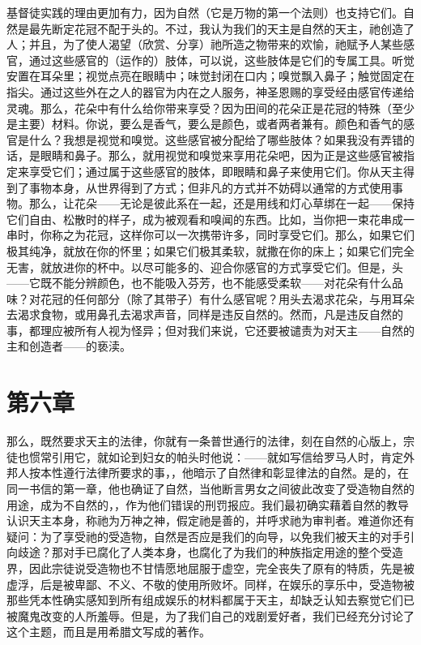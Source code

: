 基督徒实践的理由更加有力，因为自然（它是万物的第一个法则）也支持它们。自然是最先断定花冠不配于头的。不过，我认为我们的天主是自然的天主，祂创造了人；并且，为了使人渴望（欣赏、分享）祂所造之物带来的欢愉，祂赋予人某些感官，通过这些感官的（运作的）肢体，可以说，这些肢体是它们的专属工具。听觉安置在耳朵里；视觉点亮在眼睛中；味觉封闭在口内；嗅觉飘入鼻子；触觉固定在指尖。通过这些外在之人的器官为内在之人服务，神圣恩赐的享受经由感官传递给灵魂。那么，花朵中有什么给你带来享受？因为田间的花朵正是花冠的特殊（至少是主要）材料。你说，要么是香气，要么是颜色，或者两者兼有。颜色和香气的感官是什么？我想是视觉和嗅觉。这些感官被分配给了哪些肢体？如果我没有弄错的话，是眼睛和鼻子。那么，就用视觉和嗅觉来享用花朵吧，因为正是这些感官被指定来享受它们；通过属于这些感官的肢体，即眼睛和鼻子来使用它们。你从天主得到了事物本身，从世界得到了方式；但非凡的方式并不妨碍以通常的方式使用事物。那么，让花朵——无论是彼此系在一起，还是用线和灯心草绑在一起——保持它们自由、松散时的样子，成为被观看和嗅闻的东西。比如，当你把一束花串成一串时，你称之为花冠，这样你可以一次携带许多，同时享受它们。那么，如果它们极其纯净，就放在你的怀里；如果它们极其柔软，就撒在你的床上；如果它们完全无害，就放进你的杯中。以尽可能多的、迎合你感官的方式享受它们。但是，头——它既不能分辨颜色，也不能吸入芬芳，也不能感受柔软——对花朵有什么品味？对花冠的任何部分（除了其带子）有什么感官呢？用头去渴求花朵，与用耳朵去渴求食物，或用鼻孔去渴求声音，同样是违反自然的。然而，凡是违反自然的事，都理应被所有人视为怪异；但对我们来说，它还要被谴责为对天主——自然的主和创造者——的亵渎。\par


\section{第六章}

那么，既然要求天主的法律，你就有一条普世通行的法律，刻在自然的心版上，宗徒也惯常引用它，就如论到妇女的帕头时他说：——就如写信给罗马人时，肯定外邦人按本性遵行法律所要求的事，，他暗示了自然律和彰显律法的自然。是的，在同一书信的第一章，他也确证了自然，当他断言男女之间彼此改变了受造物自然的用途，成为不自然的，，作为他们错误的刑罚报应。我们最初确实藉着自然的教导认识天主本身，称祂为万神之神，假定祂是善的，并呼求祂为审判者。难道你还有疑问：为了享受祂的受造物，自然是否应是我们的向导，以免我们被天主的对手引向歧途？那对手已腐化了人类本身，也腐化了为我们的种族指定用途的整个受造界，因此宗徒说受造物也不甘情愿地屈服于虚空，完全丧失了原有的特质，先是被虚浮，后是被卑鄙、不义、不敬的使用所败坏。同样，在娱乐的享乐中，受造物被那些凭本性确实感知到所有组成娱乐的材料都属于天主，却缺乏认知去察觉它们已被魔鬼改变的人所羞辱。但是，为了我们自己的戏剧爱好者，我们已经充分讨论了这个主题，而且是用希腊文写成的著作。\par

